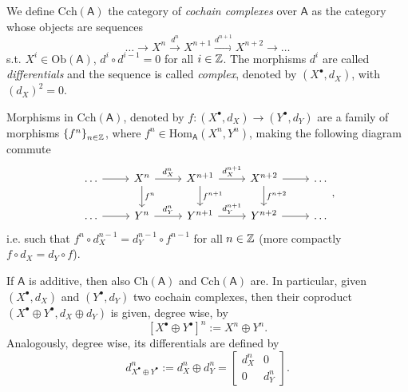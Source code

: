 \begin{defn}
	We define $\mathrm{Cch}(\mathsf{A})$ the category of {\em cochain complexes} over $\mathsf{A}$
	as the category whose objects are sequences
	\begin{equation}
	\ldots \to X^n \xrightarrow{d^n} X^{n+1}
	\xrightarrow{d^{n+1}} X^{n+2} \to \ldots
	\end{equation} 
	s.t. $X^i \in \mathrm{Ob} \left(\mathsf{A}\right)$, $d^i \circ d^{i-1} = 0$ for all $i \in \mathbb{Z}$.
	The morphisms $d^i$ are called {\em differentials} and the sequence is called {\em complex},
	denoted by $\left( X^{\bullet}, d_X \right)$, with $\left( d_X \right)^2 = 0$.

	Morphisms in $\mathrm{Cch}(\mathsf{A})$, denoted by
	$f\colon\left(X^{\bullet}, d_X\right) \to \left(Y^{\bullet}, d_Y\right)$
	are a family of morphisms $\left\{ f^n \right\}_{n \in \mathbb{Z}}$, where
	$f^n \in \mathrm{Hom}_{\mathsf{A}} \left( X^n, Y^n \right)$,
	making the following diagram commute
	\begin{equation}
	\begin{tikzcd}
		\ldots \arrow[r, "", rightarrow] &
		X^n \arrow[r, "d_X^n", rightarrow] \arrow[d, "f^n", rightarrow] &
		X^{n+1} \arrow[r, "d_X^{n+1}", rightarrow] \arrow[d, "f^{n+1}", rightarrow] &
		X^{n+2} \arrow[r, "", rightarrow] \arrow[d, "f^{n+2}", rightarrow] &
		\ldots \\
		\ldots \arrow[r, "", rightarrow] &
		Y^n \arrow[r, "d_Y^n", rightarrow]&
		Y^{n+1} \arrow[r, "d_Y^{n+1}", rightarrow] &
		Y^{n+2} \arrow[r, "", rightarrow] &
		\ldots
	\end{tikzcd}
	,\end{equation} 
	i.e. such that $f^n \circ d_X^{n-1} = d_Y^{n-1} \circ f^{n-1}$ for all $n \in \mathbb{Z}$
	(more compactly $f \circ d_X = d_Y \circ f$).
\end{defn}

\begin{rem}
	If $\mathsf{A}$ is additive, then also $\mathrm{Ch}(\mathsf{A})$ and $\mathrm{Cch}(\mathsf{A})$ are.
	In particular, given $\left(X^{\bullet}, d_X\right)$ and $\left(Y^{\bullet}, d_Y \right)$ two cochain complexes,
	then their coproduct $\left(X^{\bullet} \oplus Y^{\bullet}, d_X \oplus d_Y\right)$
	is given, degree wise, by
	\begin{equation}
	\left[ X^{\bullet} \oplus Y^{\bullet} \right]^n := X^n \oplus Y^n.
	\end{equation} 
	Analogously, degree wise, its differentials are defined by
	\begin{equation}
	d^n_{X^{\bullet} \oplus Y^{\bullet}} :=
	d^n_X \oplus d^n_Y =
	\begin{bmatrix}
		d^n_X & 0\\
		0 & d^n_Y
	\end{bmatrix} 
	.\end{equation} 
\end{rem}

